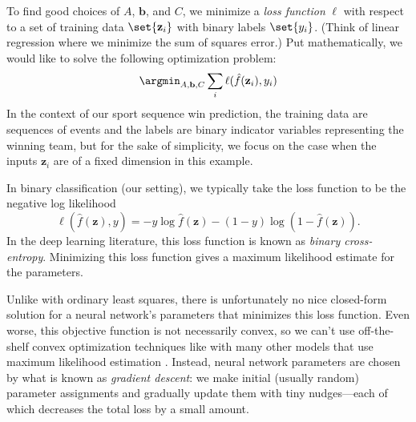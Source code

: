 To find good choices of $A$, $\mathbf b$, and $C$, we minimize a \emph{loss function} $\ell$ with respect to a set of training data $\set{\mathbf z_i}$ with binary labels $\set{y_i}$. (Think of linear regression where we minimize the sum of squares error.) Put mathematically, we would like to solve the following optimization problem:
\begin{equation*}
	\argmin_{A, \mathbf b, C} \sum_i \ell(\hat f(\mathbf z_i), y_i)
\end{equation*}
In the context of our sport sequence win prediction, the training data are sequences of events and the labels are binary indicator variables representing the winning team, but for the sake of simplicity, we focus on the case when the inputs $\mathbf z_i$ are of a fixed dimension in this example.

In binary classification (our setting), we typically take the loss function to be the negative log likelihood
\begin{equation}
	\label{eqn:bce-loss}
	\ell(\hat f(\mathbf z), y) = - y \log \hat f(\mathbf z) - (1 - y) \log (1 - \hat f(\mathbf z)).
\end{equation}
In the deep learning literature, this loss function is known as \emph{binary cross-entropy}. Minimizing this loss function gives a maximum likelihood estimate for the parameters.

Unlike with ordinary least squares, there is unfortunately no nice closed-form solution for a neural network's parameters that minimizes this loss function. Even worse, this objective function is not necessarily convex, so we can't use off-the-shelf convex optimization techniques like with many other models that use maximum likelihood estimation \cite[\S 13.4]{PML}.
Instead, neural network parameters are chosen by what is known as \emph{gradient descent}: we make initial (usually random) parameter assignments and gradually update them with tiny nudges---each of which decreases the total loss by a small amount.

